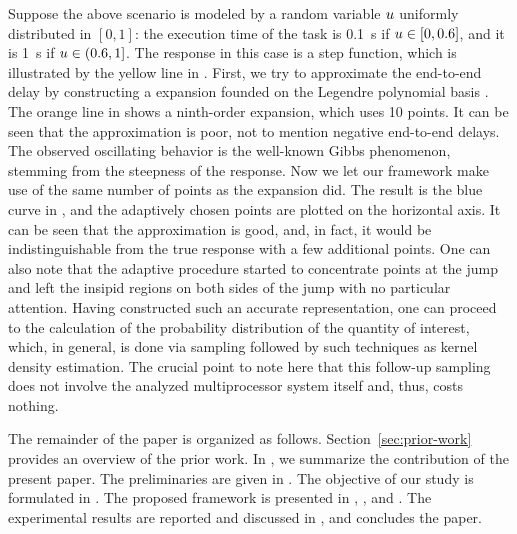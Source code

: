 Suppose the above scenario is modeled by a random variable $u$ uniformly
distributed in $[0, 1]$: the execution time of the task is 0.1~s if $u \in [0,
0.6]$, and it is 1~s if $u \in (0.6, 1]$. The response in this case is a step
function, which is illustrated by the yellow line in . First,
we try to approximate the end-to-end delay by constructing a  expansion
founded on the Legendre polynomial basis \cite{xiu2010}. The orange line in
 shows a ninth-order  expansion, which uses 10 points.
It can be seen that the approximation is poor, not to mention negative
end-to-end delays. The observed oscillating behavior is the well-known Gibbs
phenomenon, stemming from the steepness of the response. Now we let our
framework make use of the same number of points as the  expansion did.
The result is the blue curve in , and the adaptively chosen
points are plotted on the horizontal axis. It can be seen that the approximation
is good, and, in fact, it would be indistinguishable from the true response with
a few additional points. One can also note that the adaptive procedure started
to concentrate points at the jump and left the insipid regions on both sides of
the jump with no particular attention. Having constructed such an accurate
representation, one can proceed to the calculation of the probability
distribution of the quantity of interest, which, in general, is done via
sampling followed by such techniques as kernel density estimation. The crucial
point to note here that this follow-up sampling does not involve the analyzed
multiprocessor system itself and, thus, costs nothing.

The remainder of the paper is organized as follows. Section~\ref{sec:prior-work}
provides an overview of the prior work. In , we summarize the
contribution of the present paper. The preliminaries are given in
. The objective of our study is formulated in
. The proposed framework is presented in
, , and . The experimental
results are reported and discussed in , and
 concludes the paper.
